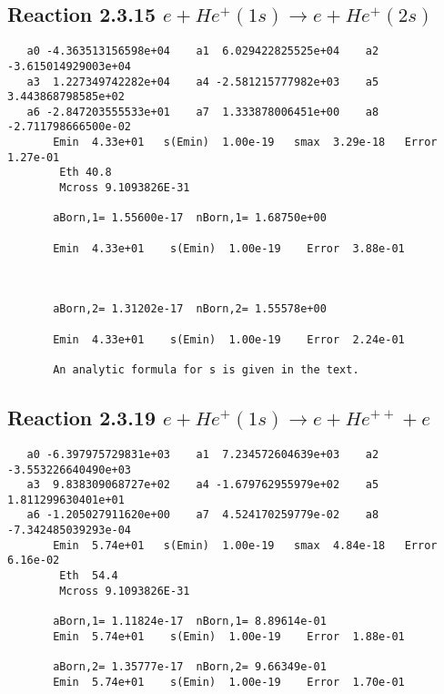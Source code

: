\documentclass[12pt,dvipdfmx]{article}
\begin{document}
\newpage
\subsection{
Reaction 2.3.15 $   e + He^+(1s) \rightarrow e + He^+(2s)$}





\begin{small}\begin{verbatim}
   a0 -4.363513156598e+04    a1  6.029422825525e+04    a2 -3.615014929003e+04
   a3  1.227349742282e+04    a4 -2.581215777982e+03    a5  3.443868798585e+02
   a6 -2.847203555533e+01    a7  1.333878006451e+00    a8 -2.711798666500e-02
       Emin  4.33e+01   s(Emin)  1.00e-19   smax  3.29e-18   Error  1.27e-01
        Eth 40.8
        Mcross 9.1093826E-31

       aBorn,1= 1.55600e-17  nBorn,1= 1.68750e+00

       Emin  4.33e+01    s(Emin)  1.00e-19    Error  3.88e-01



       aBorn,2= 1.31202e-17  nBorn,2= 1.55578e+00

       Emin  4.33e+01    s(Emin)  1.00e-19    Error  2.24e-01

       An analytic formula for s is given in the text.
\end{verbatim}\end{small}









\newpage
\subsection{
Reaction 2.3.19 $   e + He^+(1s) \rightarrow e + He^{++} + e$}


\begin{small}\begin{verbatim}
   a0 -6.397975729831e+03    a1  7.234572604639e+03    a2 -3.553226640490e+03
   a3  9.838309068727e+02    a4 -1.679762955979e+02    a5  1.811299630401e+01
   a6 -1.205027911620e+00    a7  4.524170259779e-02    a8 -7.342485039293e-04
       Emin  5.74e+01   s(Emin)  1.00e-19   smax  4.84e-18   Error  6.16e-02
        Eth  54.4
        Mcross 9.1093826E-31

       aBorn,1= 1.11824e-17  nBorn,1= 8.89614e-01
       Emin  5.74e+01    s(Emin)  1.00e-19    Error  1.88e-01

       aBorn,2= 1.35777e-17  nBorn,2= 9.66349e-01
       Emin  5.74e+01    s(Emin)  1.00e-19    Error  1.70e-01
\end{verbatim}\end{small}
\end{document}
